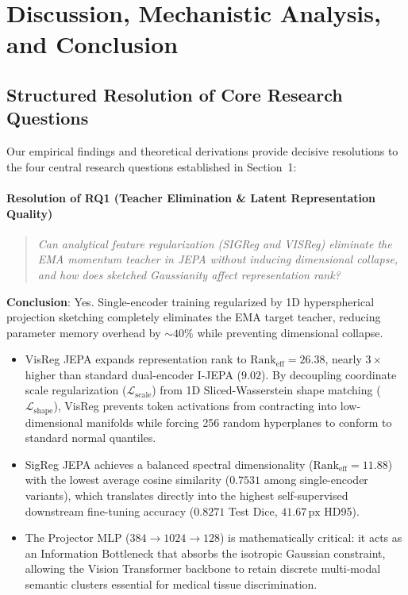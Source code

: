 \documentclass{article}
\begin{document}
\section{Discussion, Mechanistic Analysis, and Conclusion}

\subsection{Structured Resolution of Core Research Questions}

Our empirical findings and theoretical derivations provide decisive resolutions to the four central research questions established in Section~1:

\paragraph{Resolution of RQ1 (Teacher Elimination \& Latent Representation Quality)}
\begin{quote}
\emph{Can analytical feature regularization (SIGReg and VISReg) eliminate the EMA momentum teacher in JEPA without inducing dimensional collapse, and how does sketched Gaussianity affect representation rank?}
\end{quote}
\textbf{Conclusion}: Yes. Single-encoder training regularized by 1D hyperspherical projection sketching completely eliminates the EMA target teacher, reducing parameter memory overhead by $\sim 40\%$ while preventing dimensional collapse. 
\begin{itemize}
    \item VisReg JEPA expands representation rank to $\text{Rank}_{\text{eff}} = \mathbf{26.38}$, nearly $3\times$ higher than standard dual-encoder I-JEPA ($9.02$). By decoupling coordinate scale regularization ($\mathcal{L}_{\text{scale}}$) from 1D Sliced-Wasserstein shape matching ($\mathcal{L}_{\text{shape}}$), VisReg prevents token activations from contracting into low-dimensional manifolds while forcing 256 random hyperplanes to conform to standard normal quantiles.
    \item SigReg JEPA achieves a balanced spectral dimensionality ($\text{Rank}_{\text{eff}} = 11.88$) with the lowest average cosine similarity ($0.7531$ among single-encoder variants), which translates directly into the highest self-supervised downstream fine-tuning accuracy ($0.8271$ Test Dice, $41.67\,\text{px}$ HD95).
    \item The Projector MLP ($384 \to 1024 \to 128$) is mathematically critical: it acts as an Information Bottleneck that absorbs the isotropic Gaussian constraint, allowing the Vision Transformer backbone to retain discrete multi-modal semantic clusters essential for medical tissue discrimination.
\end{itemize}
\end{document}
